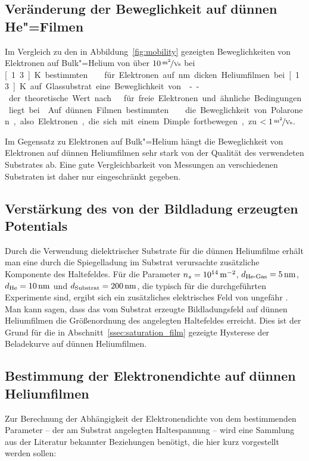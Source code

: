 \subsection{Veränderung der Beweglichkeit auf dünnen He"=Filmen}

Im Vergleich zu den in Abbildung~\ref{fig:mobility} gezeigten Beweglichkeiten von Elektronen auf Bulk"=Helium von über $\unitfrac[10]{m^2}{V s}$ bei \unit[1.3]{K} bestimmten  \ea \cite{Jia88} für Elektronen auf \unit[35]{nm} dicken Heliumfilmen bei \unit[1.3]{K} auf Glassubstrat eine Beweglichkeit von  -- der theoretische Wert nach  \cite{Sai77} für freie Elektronen und ähnliche Bedingungen liegt bei .   
Auf dünnen Filmen bestimmten  \ea \cite{Tre96} die Beweglichkeit von Polaronen, also Elektronen, die sich mit einem Dimple fortbewegen, zu $<\unitfrac[1]{m^2}{V s}$.

Im Gegensatz zu Elektronen auf Bulk"=Helium hängt die Beweglichkeit von Elektronen auf dünnen Heliumfilmen sehr stark von der Qualität des verwendeten Substrates ab. Eine gute Vergleichbarkeit von Messungen an verschiedenen Substraten ist daher nur eingeschränkt gegeben.

\subsection{Verstärkung des von der Bildladung erzeugten Potentials}
Durch die Verwendung dielektrischer Substrate für die dünnen Heliumfilme erhält man eine durch die Spiegelladung im Substrat verursachte zusätzliche Komponente des Haltefeldes. 
Für die Parameter $n_s=\unit[10^{14}]{\Em}$, $d_\text{He-Gas}=\unit[5]{nm}$, $d_\text{He}=\unit[10]{nm}$ und $d_\text{Substrat}=\unit[200]{nm}$, die typisch für die durchgeführten Experimente sind, ergibt sich ein zusätzliches elektrisches Feld von ungefähr . Man kann sagen, dass das vom Substrat erzeugte Bildladungsfeld auf dünnen Heliumfilmen die Größenordnung des angelegten Haltefeldes erreicht. Dies ist der Grund für die in Abschnitt~\ref{ssec:saturation_film} gezeigte Hysterese der Beladekurve auf dünnen Heliumfilmen.
 
\subsection{Bestimmung der Elektronendichte auf dünnen Heliumfilmen}
\label{ssec:e_density}

Zur Berechnung der Abhängigkeit der Elektronendichte von dem bestimmenden Parameter -- der am Substrat angelegten Haltespannung -- wird eine Sammlung aus der Literatur bekannter Beziehungen benötigt, die hier kurz vorgestellt werden sollen:


